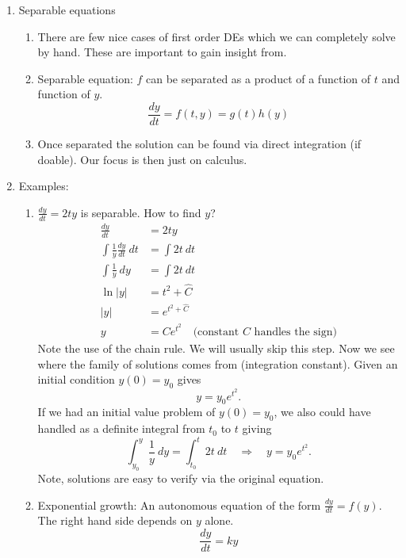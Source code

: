 \documentclass{article}
\newcommand{\ds}{\displaystyle}
\begin{document}
\begin{enumerate}

\item Separable equations
\begin{enumerate}
\item There are few nice cases of first order DEs which we can completely solve by hand. These are important to gain insight from.
\item Separable equation: $f$ can be separated as a product of a function of $t$ and function of $y$.
\[
\frac{dy}{dt} = f(t,y)= g(t)h(y)
\]
\item Once separated the solution can be found via direct integration (if doable). Our focus is then just on calculus.
\end{enumerate}

\item Examples:
\begin{enumerate}
\item $\ds \frac{dy}{dt} = 2ty$ is separable. How to find $y$?
\begin{align*}
\frac{dy}{dt} &= 2ty \\
\int \frac{1}{y} \frac{dy}{dt} ~dt &= \int 2t ~dt \\
\int \frac{1}{y} ~dy &= \int 2t ~dt \\
\ln|y| &= t^2 + \hat{C} \\
|y| &= e^{t^2 + \hat{C}} \\
y &= Ce^{t^2} \quad \text{(constant $C$ handles the sign)}
\end{align*}
Note the use of the chain rule. We will usually skip this step. Now we see where the family of solutions comes from (integration constant). Given an initial condition $y(0)=y_0$ gives
\[
y = y_0 e^{t^2}.
\]
If we had an initial value problem of $y(0)=y_0$, we also could have handled as a definite integral from $t_0$ to $t$ giving
\[
\int_{y_0}^y \frac{1}{y} ~dy = \int_{t_0}^t 2t ~dt
\quad \Rightarrow \quad
y = y_0e^{t^2}.
\]
Note, solutions are easy to verify via the original equation.

\item Exponential growth: An autonomous equation of the form $\frac{dy}{dt} = f(y)$. The right hand side depends on $y$ alone.
\[
\frac{dy}{dt} = ky
\]


\end{enumerate}
\end{enumerate}
\end{document}
